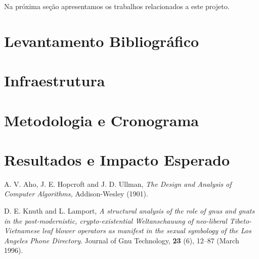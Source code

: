 \documentclass[11pt,twoside]{article}
\begin{document}
Na próxima seção apresentamos os trabalhos relacionados a este projeto.


\section{Levantamento Bibliográfico}


\section{Infraestrutura}
%


\section{Metodologia e Cronograma}
%


\section{Resultados e Impacto Esperado}
%


\begin{thebibliography}{99}

 A. V. Aho, J. E. Hopcroft and J.  D.  Ullman, {\it The
Design and Analysis of Computer Algorithms,} Addison-Wesley (1901).

 D. E. Knuth and L. Lamport, {\it A structural analysis
of the role of gnus and gnats in the post-modernistic, crypto-existential 
Weltanschauung of neo-liberal Tibeto-Vietnamese leaf blower operators 
as manifest in the sexual symbology of the Los Angeles Phone Directory}.
Journal of Gnu Technology, {\bf 23} (6), 12--87
(March 1996).

\end{thebibliography}
\end{document}
